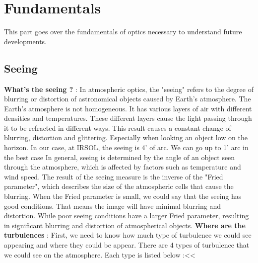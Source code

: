 \section{Fundamentals}
This part goes over the fundamentals of optics necessary to understand future developments.
\subsection{Seeing}
\textbf{What's the seeing ?} : \newline In atmospheric optics, the "seeing" refers to the degree of blurring or distortion of astronomical objects
caused by Earth's atmosphere. The Earth's atmosphere is not homogeneous. It has various layers of air with different densities and temperatures.
These different layers cause the light passing through it to be refracted in different ways. This result causes a constant change of blurring,
distortion and glittering. Especially when looking an object low on the horizon. In our case, at \Gls{IRSOL}, the seeing is 4' of arc. We can go up
to 1' arc in the best case\newline
In general, seeing is determined by the angle of an object seen through the atmosphere, which is affected by factors such as temperature and wind speed.
The result of the seeing measure is the inverse of the "Fried parameter", which describes the size of the atmospheric cells that cause the blurring.
When the Fried parameter is small, we could say that the seeing has good conditions. That means the image will have minimal blurring and distortion.
While poor seeing conditions have a larger Fried parameter, resulting in significant blurring and distortion of atmospherical objects.
\bigbreak
\textbf{Where are the turbulences} : \newline
First, we need to know how much type of turbulence we could see appearing and where they could be appear.\newline
There are 4 types of turbulence that we could see on the atmosphere. Each type is listed below :<<
